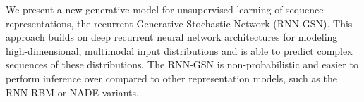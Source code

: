 We present a new generative model for unsupervised learning of sequence representations, the recurrent Generative Stochastic Network (RNN-GSN). This approach builds on deep recurrent neural network architectures for modeling high-dimensional, multimodal input distributions and is able to predict complex sequences of these distributions. The RNN-GSN is non-probabilistic and easier to perform inference over compared to other representation models, such as the RNN-RBM or NADE variants.